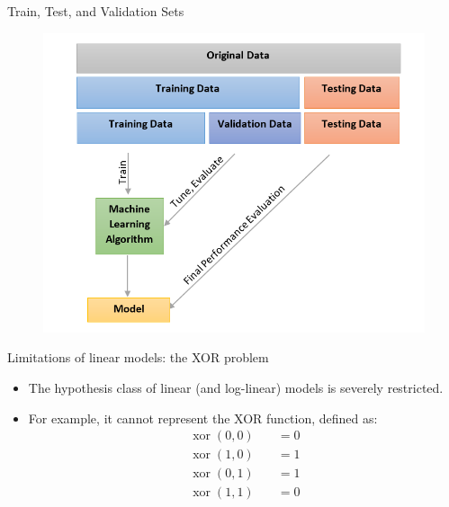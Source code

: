 \documentclass[handout]{beamer}
\begin{document}
\begin{frame}{Train, Test, and Validation Sets}
\begin{scriptsize}

 \begin{figure}[htb]
	\centering
	 \includegraphics[scale=0.55]{pics/validation.png}
\end{figure}


\end{scriptsize}
\end{frame}


\begin{frame}{Limitations of linear models: the XOR problem}
\begin{scriptsize}
\begin{itemize}
\item The hypothesis class of linear (and log-linear) models is severely restricted.
\item For example, it cannot represent the XOR function, defined as:
\begin{equation}
 \begin{split}
  \operatorname{xor}(0,0) \quad & = 0 \\
  \operatorname{xor}(1,0) \quad & = 1 \\
  \operatorname{xor}(0,1) \quad & = 1 \\
  \operatorname{xor}(1,1) \quad & = 0 \\
 \end{split}
\end{equation}
\end{itemize}
\end{scriptsize}
\end{frame}
\end{document}
